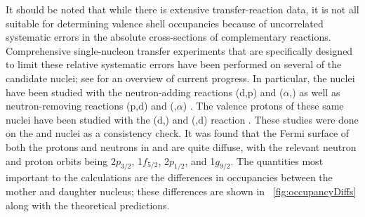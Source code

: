 It should be noted that while there is extensive transfer-reaction data, it is not all suitable for determining valence shell occupancies because of uncorrelated systematic errors in the absolute cross-sections of complementary reactions.  Comprehensive single-nucleon transfer experiments that are specifically designed to limit these relative systematic errors have been performed on several of the candidate nuclei; see \citep{schiffer_review} for an overview of current progress.  In particular, the nuclei \GeTargets have been studied with the neutron-adding reactions (d,p) and ($\alpha$,) as well as neutron-removing reactions (p,d) and (,$\alpha$) \citep{valenceNeutrons}.  The valence protons of these same nuclei have been studied with the (d,) and (,d) reaction \citep{valenceProtons}.  These studies were done on the  and  nuclei as a consistency check.  It was found that the Fermi surface of both the protons and neutrons in \GeTargets and \SeProducts are quite diffuse, with the relevant neutron and proton orbits being 2$p_{3/2}$, 1$f_{5/2}$, 2$p_{1/2}$, and 1$g_{9/2}$.  The quantities most important to the \NME calculations are the differences in occupancies between the mother and daughter nucleus; these differences are shown in {\fig}~\ref{fig:occupancyDiffs} along with the theoretical predictions.
